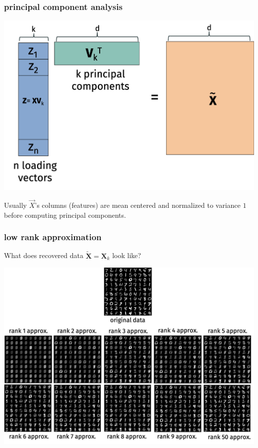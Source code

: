 \documentclass[handout,compress]{beamer}
\newcommand{\bv}[1]{\mathbf{#1}}
\begin{document}
\begin{frame}[t]
	\frametitle{principal component analysis}
	\begin{center}
		\includegraphics[width=.8\textwidth]{pca.png}
	\end{center} 
Usually $\vec{X}$'s columns (features) are mean centered and normalized to variance $1$ before computing principal components.
\end{frame}

\begin{frame}[t]
	\frametitle{low rank approximation}
	\begin{center}
	\vspace{-.5em}
	What does recovered data $\tilde{\bv{X}} = \bv{X}_k$ look like?
	
	\includegraphics[width=.95\textwidth]{low_rank_approxs2.png}
	\end{center}
\end{frame} 
\end{document}

